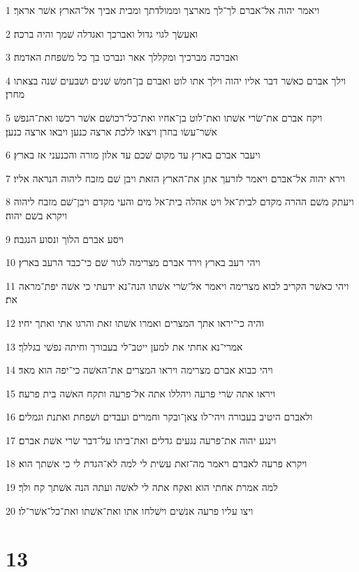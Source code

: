 \par 1 ויאמר יהוה אל־אברם לך־לך מארצך וממולדתך ומבית אביך אל־הארץ אשׁר אראך׃
\par 2 ואעשׂך לגוי גדול ואברכך ואגדלה שׁמך והיה ברכה׃
\par 3 ואברכה מברכיך ומקללך אאר ונברכו בך כל משׁפחת האדמה׃
\par 4 וילך אברם כאשׁר דבר אליו יהוה וילך אתו לוט ואברם בן־חמשׁ שׁנים ושׁבעים שׁנה בצאתו מחרן׃
\par 5 ויקח אברם את־שׂרי אשׁתו ואת־לוט בן־אחיו ואת־כל־רכושׁם אשׁר רכשׁו ואת־הנפשׁ אשׁר־עשׂו בחרן ויצאו ללכת ארצה כנען ויבאו ארצה כנען׃
\par 6 ויעבר אברם בארץ עד מקום שׁכם עד אלון מורה והכנעני אז בארץ׃
\par 7 וירא יהוה אל־אברם ויאמר לזרעך אתן את־הארץ הזאת ויבן שׁם מזבח ליהוה הנראה אליו׃
\par 8 ויעתק משׁם ההרה מקדם לבית־אל ויט אהלה בית־אל מים והעי מקדם ויבן־שׁם מזבח ליהוה ויקרא בשׁם יהוה׃
\par 9 ויסע אברם הלוך ונסוע הנגבה׃
\par 10 ויהי רעב בארץ וירד אברם מצרימה לגור שׁם כי־כבד הרעב בארץ׃
\par 11 ויהי כאשׁר הקריב לבוא מצרימה ויאמר אל־שׂרי אשׁתו הנה־נא ידעתי כי אשׁה יפת־מראה את׃
\par 12 והיה כי־יראו אתך המצרים ואמרו אשׁתו זאת והרגו אתי ואתך יחיו׃
\par 13 אמרי־נא אחתי את למען ייטב־לי בעבורך וחיתה נפשׁי בגללך׃
\par 14 ויהי כבוא אברם מצרימה ויראו המצרים את־האשׁה כי־יפה הוא מאד׃
\par 15 ויראו אתה שׂרי פרעה ויהללו אתה אל־פרעה ותקח האשׁה בית פרעה׃
\par 16 ולאברם היטיב בעבורה ויהי־לו צאן־ובקר וחמרים ועבדים ושׁפחת ואתנת וגמלים׃
\par 17 וינגע יהוה את־פרעה נגעים גדלים ואת־ביתו על־דבר שׂרי אשׁת אברם׃
\par 18 ויקרא פרעה לאברם ויאמר מה־זאת עשׂית לי למה לא־הגדת לי כי אשׁתך הוא׃
\par 19 למה אמרת אחתי הוא ואקח אתה לי לאשׁה ועתה הנה אשׁתך קח ולך׃
\par 20 ויצו עליו פרעה אנשׁים וישׁלחו אתו ואת־אשׁתו ואת־כל־אשׁר־לו׃

\chapter{13}

